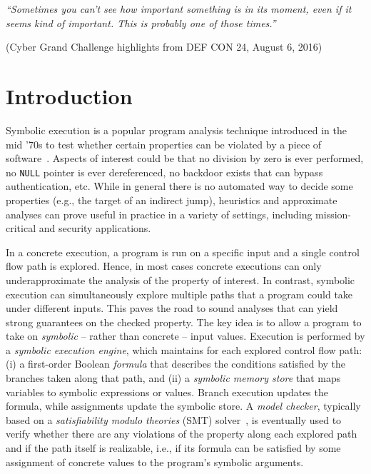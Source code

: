 
\epigraph{\textit{``Sometimes you can't see how important something is in its moment, even if it seems kind of important. This is probably one of those times.''}}{(Cyber Grand Challenge highlights from DEF CON 24, August 6, 2016)}

\vspace{-2.5mm}
\section{Introduction}
\label{se:intro}

Symbolic execution is a popular program analysis technique introduced in the mid '70s to test whether certain properties can be violated by a piece of software~\cite{K-ICRS75,SELECT-ICRS75,K-CACM76,H-TSE77}. Aspects of interest could be that no division by zero is ever performed, no {\tt NULL} pointer is ever dereferenced, no backdoor exists that can bypass authentication, etc. While in general there is no automated way to decide some properties (e.g., the target of an indirect jump), heuristics and approximate analyses can prove useful in practice in a variety of settings, including mission-critical and security applications.


In a concrete execution, a program is run on a specific input and a single control flow path is explored. Hence, in most cases concrete executions can only underapproximate the analysis of the property of interest. In contrast, symbolic execution can simultaneously explore multiple paths that a program could take under different inputs. This paves the road to sound analyses that can yield strong guarantees on the checked property. 
The key idea is to allow a program to take on {\em symbolic} -- rather than concrete -- input values. Execution is performed by a {\em symbolic execution engine}, which maintains for each explored control flow path: (i) a first-order Boolean {\em formula} that describes the conditions satisfied by the branches taken along that path, and (ii) a {\em symbolic memory store} that maps variables to symbolic expressions or values. Branch execution updates the formula, while assignments update the symbolic store. A {\em model checker}, typically based on a {\em satisfiability modulo theories} (SMT) solver~\cite{BKM14}, is eventually used to verify whether there are any violations of the property along each explored path and if the path itself is realizable, i.e., if its formula can be satisfied by some assignment of concrete values to the program's symbolic arguments.

